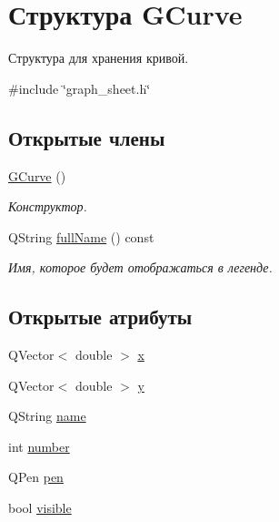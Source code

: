 \hypertarget{struct_g_curve}{}\section{Структура G\+Curve}
\label{struct_g_curve}


Структура для хранения кривой.  




{\ttfamily \#include \char`\"{}graph\+\_\+sheet.\+h\char`\"{}}

\subsection*{Открытые члены}
\begin{DoxyCompactItemize}
\item 
\hypertarget{struct_g_curve_aac51f0bf1cb305e7872d94ee88eef9ba}{}\label{struct_g_curve_aac51f0bf1cb305e7872d94ee88eef9ba} 
\hyperlink{struct_g_curve_aac51f0bf1cb305e7872d94ee88eef9ba}{G\+Curve} ()
\begin{DoxyCompactList}\small\item\em Конструктор. \end{DoxyCompactList}\item 
Q\+String \hyperlink{struct_g_curve_ad9ab2e3ed72e50aaf536db8b961987cc}{full\+Name} () const
\begin{DoxyCompactList}\small\item\em Имя, которое будет отображаться в легенде. \end{DoxyCompactList}\end{DoxyCompactItemize}
\subsection*{Открытые атрибуты}
\begin{DoxyCompactItemize}
\item 
Q\+Vector$<$ double $>$ \hyperlink{struct_g_curve_af4a77d5615109cd4068e11dcc2b52615}{x}
\item 
Q\+Vector$<$ double $>$ \hyperlink{struct_g_curve_a40d381ce3d5ea2ccf654b9e35a8f594b}{y}
\item 
Q\+String \hyperlink{struct_g_curve_a39cc624ec8dffac8afb249e9c6861b88}{name}
\item 
int \hyperlink{struct_g_curve_a67acaf70967bdbaa8c02c614502baacc}{number}
\item 
Q\+Pen \hyperlink{struct_g_curve_ac3f500b2153788be5232dc7a623354ce}{pen}
\item 
bool \hyperlink{struct_g_curve_ac00a68184b569dda559808f50729f96a}{visible}
\end{DoxyCompactItemize}



